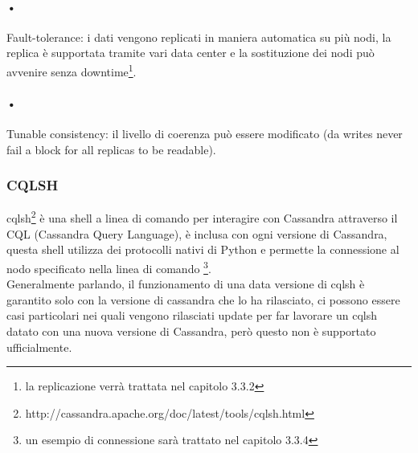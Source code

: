 \paragraph{•} Fault-tolerance: i dati vengono replicati in maniera automatica su più nodi, la replica è supportata tramite vari data center e la sostituzione dei nodi può avvenire senza downtime\footnote{la replicazione verrà trattata nel capitolo 3.3.2}.
\paragraph{•} Tunable consistency: il livello di coerenza può essere modificato (da writes never fail a block for all replicas to be readable).
\subsubsection{CQLSH}
\hspace{\parindent}cqlsh\footnote{http://cassandra.apache.org/doc/latest/tools/cqlsh.html} è una shell a linea di comando per interagire con Cassandra attraverso il CQL (Cassandra Query Language), è inclusa con ogni versione di Cassandra, questa shell utilizza dei protocolli nativi di Python e permette la connessione al nodo specificato nella linea di comando \footnote{un esempio di connessione sarà trattato nel capitolo 3.3.4}.
\\Generalmente parlando, il funzionamento di una data versione di cqlsh  è garantito solo con la versione di cassandra che lo ha rilasciato, ci possono essere casi particolari nei quali vengono rilasciati update per far lavorare un cqlsh datato con una nuova versione di Cassandra, però questo non è supportato ufficialmente.